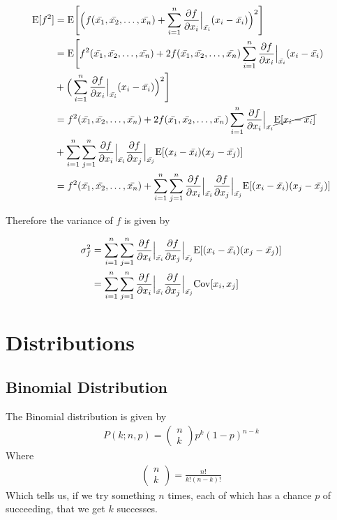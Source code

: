 \begin{align}
\mathrm{E}[f^2] &= \mathrm{E}\Bigg[\Big(f(\bar{x_1}, \bar{x_2}, \dots, \bar{x_n}) + \sum_{i=1}^n \frac{\partial f}{\partial x_i}\Big|_{\bar{x_i}}(x_i-\bar{x_i})\Big)^2\Bigg]\\
&= \mathrm{E}\Bigg[f^2(\bar{x_1}, \bar{x_2}, \dots, \bar{x_n}) + 2f(\bar{x_1}, \bar{x_2}, \dots, \bar{x_n})\sum_{i=1}^n \frac{\partial f}{\partial x_i}\Big|_{\bar{x_i}}(x_i-\bar{x_i})\\
&+ \Big(\sum_{i=1}^n \frac{\partial f}{\partial x_i}\Big|_{\bar{x_i}}(x_i-\bar{x_i})\Big)^2\Bigg]\\
&= f^2(\bar{x_1}, \bar{x_2}, \dots, \bar{x_n}) + 2f(\bar{x_1}, \bar{x_2}, \dots, \bar{x_n})\sum_{i=1}^n \frac{\partial f}{\partial x_i}\Big|_{\bar{x_i}}\cancel{\mathrm{E}[x_i-\bar{x_i}]}\\
&+ \sum_{i=1}^n \sum_{j=1}^n \frac{\partial f}{\partial x_i}\Big|_{\bar{x_i}}\frac{\partial f}{\partial x_j}\Big|_{\bar{x_j}}\mathrm{E}[(x_i-\bar{x_i})(x_j-\bar{x_j})]\\
&= f^2(\bar{x_1}, \bar{x_2}, \dots, \bar{x_n}) + \sum_{i=1}^n \sum_{j=1}^n \frac{\partial f}{\partial x_i}\Big|_{\bar{x_i}}\frac{\partial f}{\partial x_j}\Big|_{\bar{x_j}}\mathrm{E}[(x_i-\bar{x_i})(x_j-\bar{x_j})]
\end{align}

Therefore the variance of $f$ is given by

\begin{align}
\sigma_f^2 &= \sum_{i=1}^n \sum_{j=1}^n \frac{\partial f}{\partial x_i}\Big|_{\bar{x_i}}\frac{\partial f}{\partial x_j}\Big|_{\bar{x_j}}\mathrm{E}[(x_i-\bar{x_i})(x_j-\bar{x_j})]\\
		&= \sum_{i=1}^n \sum_{j=1}^n \frac{\partial f}{\partial x_i}\Big|_{\bar{x_i}}\frac{\partial f}{\partial x_j}\Big|_{\bar{x_j}}\mathrm{Cov}[x_i,x_j]
\end{align}

\label{ch:statistics}

\section{Distributions}
\subsection{Binomial Distribution}
The Binomial distribution is given by
\begin{align}
P(k;n,p) = \begin{pmatrix}
n\\
k
\end{pmatrix}p^k(1-p)^{n-k}
\end{align}
Where 
\begin{align}
\begin{pmatrix}
n\\
k
\end{pmatrix} = \frac{n!}{k!(n-k)!}
\end{align}
Which tells us, if we try something $n$ times, each of which has a chance $p$ of succeeding, that we get $k$ successes. 

